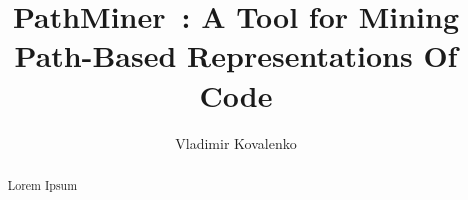 \documentclass[sigconf]{acmart}
\newcommand{\toolname}{PathMiner~}
\begin{document}
\title{\toolname: A Tool for Mining Path-Based Representations Of Code}


\author{Vladimir Kovalenko}


\begin{abstract}
Lorem Ipsum
\end{abstract}

\maketitle

% 




\end{document}
